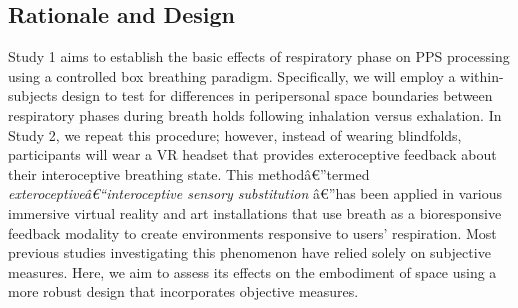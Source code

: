 \subsection{Rationale and Design}
Study 1 aims to establish the basic effects of respiratory phase on PPS processing using a controlled box breathing paradigm. Specifically, we will employ a within-subjects design to test for differences in peripersonal space boundaries between respiratory phases during breath holds following inhalation versus exhalation. In Study 2, we repeat this procedure; however, instead of wearing blindfolds, participants will wear a VR headset that provides exteroceptive feedback about their interoceptive breathing state. This methodâ€”termed \textit{exteroceptiveâ€“interoceptive sensory substitution} \citep{Goral2024}â€”has been applied in various immersive virtual reality and art installations that use breath as a bioresponsive feedback modality to create environments responsive to users' respiration. Most previous studies investigating this phenomenon have relied solely on subjective measures. Here, we aim to assess its effects on the embodiment of space using a more robust design that incorporates objective measures.
